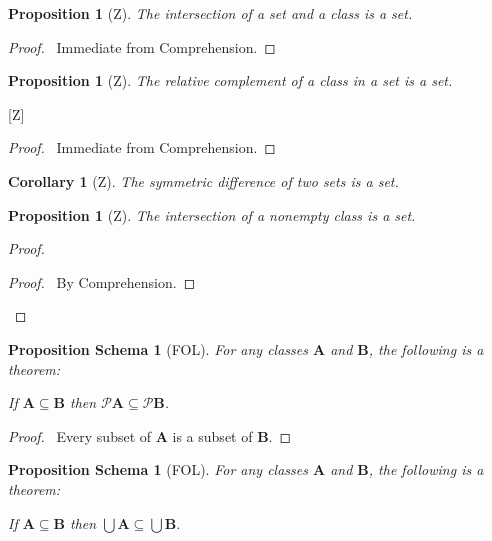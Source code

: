 \documentclass{book}
\let\qed\relax
\newtheorem{prop}[ax]{Proposition}
\newtheorem{props}[ax]{Proposition Schema}
\newtheorem{cor}{Corollary}[ax]
\theoremstyle{definition}
\begin{document}
\begin{prop}[Z]
The intersection of a set and a class is a set.
\end{prop}

\begin{proof}
\pf\ Immediate from Comprehension. \qed
\end{proof}

\begin{prop}[Z]
The relative complement of a class in a set is a set.
\end{prop}[Z]

\begin{proof}
\pf\ Immediate from Comprehension. \qed
\end{proof}

\begin{cor}[Z]
The symmetric difference of two sets is a set.
\end{cor}

\begin{prop}[Z]
The intersection of a nonempty class is a set.
\end{prop}

\begin{proof}
\pf
{}
\begin{proof}
	\pf\ By Comprehension.
\end{proof}
\qed
\end{proof}

\begin{props}[FOL]
\label{prop:powermono}
For any classes $\mathbf{A}$ and $\mathbf{B}$, the following is a theorem:

If $\mathbf{A} \subseteq \mathbf{B}$ then $\mathcal{P} \mathbf{A} \subseteq \mathcal{P} \mathbf{B}$.
\end{props}

\begin{proof}
\pf\ Every subset of $\mathbf{A}$ is a subset of $\mathbf{B}$. \qed
\end{proof}

\begin{props}[FOL]
\label{prop:unionmonotone}
For any classes $\mathbf{A}$ and $\mathbf{B}$, the following is a theorem:

If $\mathbf{A} \subseteq \mathbf{B}$ then $\bigcup \mathbf{A} \subseteq \bigcup \mathbf{B}$.
\end{props}
\end{document}
